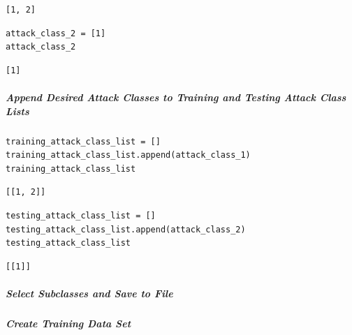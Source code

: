 \begin{verbatim}
[1, 2]
\end{verbatim}

\begin{verbatim}
attack_class_2 = [1]
attack_class_2
\end{verbatim}

\begin{verbatim}
[1]
\end{verbatim}

\subparagraph{Append Desired Attack Classes to Training and Testing Attack Class Lists}

\begin{verbatim}
training_attack_class_list = []
training_attack_class_list.append(attack_class_1)
training_attack_class_list
\end{verbatim}

\begin{verbatim}
[[1, 2]]
\end{verbatim}

\begin{verbatim}
testing_attack_class_list = []
testing_attack_class_list.append(attack_class_2)
testing_attack_class_list
\end{verbatim}

\begin{verbatim}
[[1]]
\end{verbatim}

\subparagraph{Select Subclasses and Save to File}

\subparagraph{Create Training Data Set}

